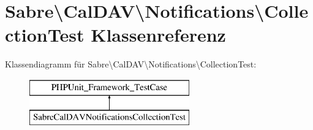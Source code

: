 \hypertarget{class_sabre_1_1_cal_d_a_v_1_1_notifications_1_1_collection_test}{}\section{Sabre\textbackslash{}Cal\+D\+AV\textbackslash{}Notifications\textbackslash{}Collection\+Test Klassenreferenz}
\label{class_sabre_1_1_cal_d_a_v_1_1_notifications_1_1_collection_test}
Klassendiagramm für Sabre\textbackslash{}Cal\+D\+AV\textbackslash{}Notifications\textbackslash{}Collection\+Test\+:\begin{figure}[H]
\begin{center}
\leavevmode
\includegraphics[height=2.000000cm]{class_sabre_1_1_cal_d_a_v_1_1_notifications_1_1_collection_test}
\end{center}
\end{figure}
